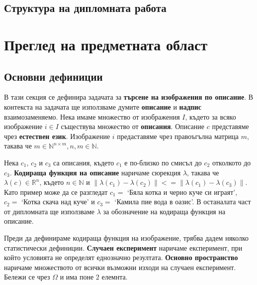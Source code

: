 \documentclass[a4paper,12pt]{article}
\begin{document}
\subsection{Структура на дипломната работа}

\section{Преглед на предметната област}

\subsection{Основни дефиниции}

В тази секция се дефинира задачата за \textbf{търсене на изображения по описание}. В контекста на задачата ще използваме думите \textbf{описание} и \textbf{надпис} взаимозаменяемо. Нека имаме множество от изображения $I$, където за всяко изображение $i \in I$ съществува множество от \textbf{описания}. Описание $c$ представяме чрез \textbf{естествен език}. Изображение $i$ предаставяме чрез правоъгълна матрица $m$, такава че $m \in \mathbb{N}^{n \times m}, n,m \in \mathbb{N}$.

\bigbreak

Нека $c_1$, $c_2$ и $c_3$ са описания, където $c_1$ е по-близко по смисъл до $c_2$ отколкото до $c_3$. \textbf{Кодираща функция на описание} наричаме сюрекция $\lambda$, такава че $\lambda(c) \in \mathbb{R}^n$, където $n \in \mathbb{N}$ и $\| \lambda(c_1) - \lambda(c_2) \| <= \| \lambda(c_1) - \lambda(c_3) \|$. Като пример може да се разгледат $c_1 = $ `Бяла котка и черно куче си играят', $c_2 = $ `Котка скача над куче' и $c_3 = $ `Камила пие вода в оазис'. В останалата част от дипломната ще използваме $\lambda$ за обозначение на кодираща функция на описание.

\bigbreak

Преди да дефинираме кодираща функция на изображение, трябва дадем няколко статистически дефиниции. \textbf{Случаен експеримент} наричаме експеримент, при който условията не определят еднозначно резултата. \textbf{Основно пространство} наричаме множеството от всички възможни изходи на случаен експеримент. Бележи се чрез $\Omega$ и има поне $2$ елемнта.
\end{document}
